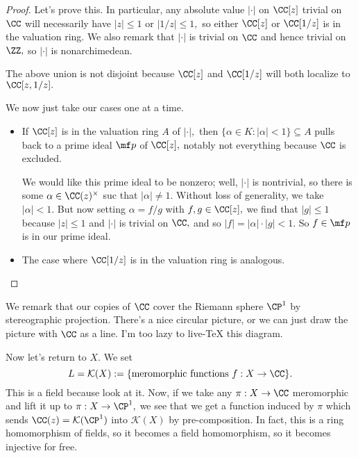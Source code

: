 \begin{proof}
	Let's prove this. In particular, any absolute value $|\cdot|$ on $\CC[z]$ trivial on $\CC$ will necessarily have $|z|\le1$ or $|1/z|\le1,$ so either $\CC[z]$ or $\CC[1/z]$ is in the valuation ring. We also remark that $|\cdot|$ is trivial on $\CC$ and hence trivial on $\ZZ,$ so $|\cdot|$ is nonarchimedean.
	\begin{remark}
		The above union is not disjoint because $\CC[z]$ and $\CC[1/z]$ will both localize to $\CC[z,1/z].$
	\end{remark}
	We now just take our cases one at a time.
	\begin{itemize}
		\item If $\CC[z]$ is in the valuation ring $A$ of $|\cdot|,$ then $\{\alpha\in K:|\alpha|<1\}\subseteq A$ pulls back to a prime ideal $\mf p$ of $\CC[z],$ notably not everything because $\CC$ is excluded.
		
		We would like this prime ideal to be nonzero; well, $|\cdot|$ is nontrivial, so there is some $\alpha\in\CC(z)^\times$ suc that $|\alpha|\ne1.$ Without loss of generality, we take $|\alpha|<1.$ But now setting $\alpha=f/g$ with $f,g\in\CC[z],$ we find that $|g|\le1$ because $|z|\le1$ and $|\cdot|$ is trivial on $\CC,$ and so $|f|=|\alpha|\cdot|g|<1.$ So $f\in\mf p$ is in our prime ideal.
		\item The case where $\CC[1/z]$ is in the valuation ring is analogous.
		\qedhere
	\end{itemize}
\end{proof}
We remark that our copies of $\CC$ cover the Riemann sphere $\CP^1$ by stereographic projection. There's a nice circular picture, or we can just draw the picture with $\CC$ as a line. I'm too lazy to live-TeX this diagram.

Now let's return to $X.$ We set
\[L=\mathcal K(X):=\{\text{meromorphic functions }f:X\to\CC\}.\]
This is a field because look at it. Now, if we take any $\pi:X\to\CC$ meromorphic and lift it up to $\pi:X\to\CP^1,$ we see that we get a function induced by $\pi$ which sends $\CC(z)=\mathcal K(\CP^1)$ into $\mathcal K(X)$ by pre-composition. In fact, this is a ring homomorphism of fields, so it becomes a field homomorphism, so it becomes injective for free.

